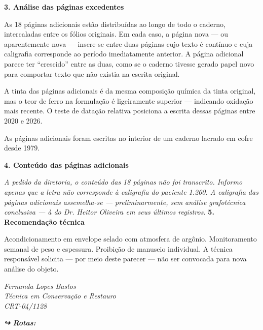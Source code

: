 \noindent \textbf{3. Análise das páginas excedentes}

\noindent As 18 páginas adicionais estão distribuídas ao longo de todo o caderno, intercaladas entre os fólios originais. Em cada caso, a página nova --- ou aparentemente nova --- insere-se entre duas páginas cujo texto é contínuo e cuja caligrafia corresponde ao período imediatamente anterior. A página adicional parece ter ``crescido'' entre as duas, como se o caderno tivesse gerado papel novo para comportar texto que não existia na escrita original.

\noindent A tinta das páginas adicionais é da mesma composição química da tinta original, mas o teor de ferro na formulação é ligeiramente superior --- indicando oxidação mais recente. O teste de datação relativa posiciona a escrita dessas páginas entre 2020 e 2026.

\noindent As páginas adicionais foram escritas no interior de um caderno lacrado em cofre desde 1979.

\noindent \textbf{4. Conteúdo das páginas adicionais}

\noindent \textit{A pedido da diretoria, o conteúdo das 18 páginas não foi transcrito. Informo apenas que a letra não corresponde à caligrafia do paciente 1.260. A caligrafia das páginas adicionais assemelha-se --- preliminarmente, sem análise grafotécnica conclusiva --- à do Dr. Heitor Oliveira em seus últimos registros.}
\noindent \textbf{5. Recomendação técnica}

\noindent Acondicionamento em envelope selado com atmosfera de argônio. Monitoramento semanal de peso e espessura. Proibição de manuseio individual. A técnica responsável solicita --- por meio deste parecer --- não ser convocada para nova análise do objeto.

\noindent \textit{Fernanda Lopes Bastos}\\
\noindent \textit{Técnica em Conservação e Restauro}\\
\noindent \textit{CRT-04/1128}

\vspace{0.5em}
\noindent\textit{\textbf{↪ Rotas:}  \rotasep {} \rotasep {}}

